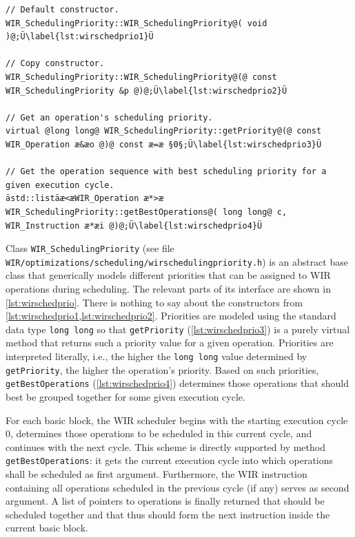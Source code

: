 \begin{lstlisting}[style=code,float=!t,caption={Relevant Interface of Class \texttt{WIR\_SchedulingPriority}},label=lst:wirschedprio]
// Default constructor.
WIR_SchedulingPriority::WIR_SchedulingPriority@( void )@;Ü\label{lst:wirschedprio1}Ü

// Copy constructor.
WIR_SchedulingPriority::WIR_SchedulingPriority@(@ const WIR_SchedulingPriority &p @)@;Ü\label{lst:wirschedprio2}Ü

// Get an operation's scheduling priority.
virtual @long long@ WIR_SchedulingPriority::getPriority@(@ const WIR_Operation æ&æo @)@ const æ=æ §0§;Ü\label{lst:wirschedprio3}Ü

// Get the operation sequence with best scheduling priority for a given execution cycle.
ästd::listäæ<æWIR_Operation æ*>æ WIR_SchedulingPriority::getBestOperations@( long long@ c, WIR_Instruction æ*æi @)@;Ü\label{lst:wirschedprio4}Ü
\end{lstlisting}

Class \texttt{WIR\_SchedulingPriority} (see file \texttt{WIR/optimizations/scheduling/wirschedulingpriority.h}) is an abstract base class that generically models different priorities that can be assigned to \gls{WIR} operations during scheduling.
The relevant parts of its interface are shown in \cref{lst:wirschedprio}.
There is nothing to say about the constructors from \cref{lst:wirschedprio1,lst:wirschedprio2}.
Priorities are modeled using the standard data type \texttt{long long} so that \texttt{getPriority} (\cref{lst:wirschedprio3}) is a purely virtual method that returns such a priority value for a given operation.
Priorities are interpreted literally, i.e., the higher the \texttt{long long} value determined by \texttt{getPriority}, the higher the operation's priority.
Based on such priorities, \texttt{getBestOperations} (\cref{lst:wirschedprio4}) determines those operations that should best be grouped together for some given execution cycle.

For each basic block, the \gls{WIR} scheduler begins with the starting execution cycle 0, determines those operations to be scheduled in this current cycle, and continues with the next cycle.
This scheme is directly supported by method \texttt{getBestOperations}: it gets the current execution cycle into which operations shall be scheduled as first argument.
Furthermore, the \gls{WIR} instruction containing all operations scheduled in the previous cycle (if any) serves as second argument.
A list of pointers to operations is finally returned that should be scheduled together and that thus should form the next instruction inside the current basic block.

